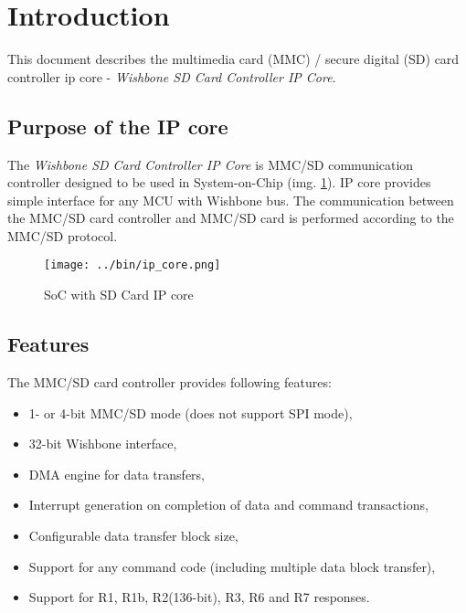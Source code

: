 \section{Introduction}
\label{sec:introduction}

    This document describes the multimedia card (MMC) / secure digital (SD) card controller ip core - \textit{Wishbone SD Card Controller IP Core}.

    \subsection{Purpose of the IP core}
    \label{sec:purpose}

    The \textit{Wishbone SD Card Controller IP Core} is MMC/SD communication controller designed to be used in System-on-Chip (img. \ref{img:ip_core}).
    IP core provides simple interface for any MCU with Wishbone bus. The communication between the MMC/SD card controller and MMC/SD card 
    is performed according to the MMC/SD protocol.
    
    \begin{figure}[H]
        \centering
        \texttt{[image: ../bin/ip\_core.png]}
        \caption{SoC with SD Card IP core}
        \label{img:ip_core}
    \end{figure}
    
    \subsection{Features}
    \label{sec:fetures}
    The MMC/SD card controller provides following features:
    
    \begin{itemize}
     \item 1- or 4-bit MMC/SD mode (does not support SPI mode),
     \item 32-bit Wishbone interface,
     \item DMA engine for data transfers,
     \item Interrupt generation on completion of data and command transactions,
     \item Configurable data transfer block size,
     \item Support for any command code (including multiple data block transfer),
     \item Support for R1, R1b, R2(136-bit), R3, R6 and R7 responses.
    \end{itemize}
